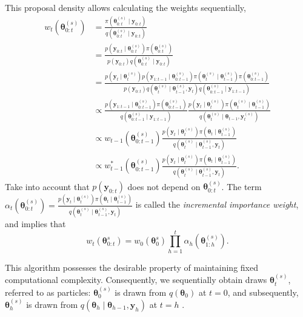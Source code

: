 This proposal density allows calculating the weights sequentially,
\begin{align*}
	w_{t}(\bm{\theta}^{(s)}_{0:t})&=\frac{\pi(\bm{\theta}_{0:t}^{(s)}\mid \bm{y}_{0:t})}{q(\bm{\theta}_{0:t}^{(s)}\mid \bm{y}_{0:t})}\\
	&=\frac{p(\bm{y}_{0:t}\mid \bm{\theta}_{0:t}^{(s)})\pi(\bm{\theta}_{0:t}^{(s)})}{p(\bm{y}_{0:t})q(\bm{\theta}_{0:t}^{(s)}\mid \bm{y}_{0:t})}\\
	&=\frac{p(\bm{y}_{t}\mid \bm{\theta}_{t}^{(s)})p(\bm{y}_{1:t-1}\mid \bm{\theta}_{0:t-1}^{(s)})\pi(\bm{\theta}_{t}^{(s)}\mid \bm{\theta}_{t-1}^{(s)})\pi(\bm{\theta}_{0:t-1}^{(s)})}{p(\bm{y}_{0:t})q(\bm{\theta}_{t}^{(s)}\mid \bm{\theta}_{t-1}^{(s)},\bm{y}_{t})q(\bm{\theta}_{0:t-1}^{(s)}\mid \bm{y}_{1:t-1})}\\
	&\propto\frac{p(\bm{y}_{1:t-1}\mid \bm{\theta}_{0:t-1}^{(s)})\pi(\bm{\theta}_{0:t-1}^{(s)})}{q(\bm{\theta}_{0:t-1}^{(s)}\mid \bm{y}_{1:t-1})}\frac{p(\bm{y}_{t}\mid \bm{\theta}_{t}^{(s)})\pi(\bm{\theta}_{t}^{(s)}\mid \bm{\theta}_{t-1}^{(s)})}{q(\bm{\theta}_{t}^{(s)}\mid \bm{\theta}_{t-1},\bm{y}_{t}^{(s)})}\\
	&\propto w_{t-1}(\bm{\theta}^{(s)}_{0:t-1})\frac{p(\bm{y}_{t}\mid \bm{\theta}_{t}^{(s)})\pi(\bm{\theta}_{t}\mid \bm{\theta}_{t-1}^{(s)})}{q(\bm{\theta}_t^{(s)}\mid \bm{\theta}_{t-1}^{(s)},\bm{y}_{t})}\\
	&\propto w_{t-1}^*(\bm{\theta}^{(s)}_{0:t-1})\frac{p(\bm{y}_{t}\mid \bm{\theta}_{t}^{(s)})\pi(\bm{\theta}_{t}\mid \bm{\theta}_{t-1}^{(s)})}{q(\bm{\theta}_t^{(s)}\mid \bm{\theta}_{t-1}^{(s)},\bm{y}_{t})}.
\end{align*} 
Take into account that $p(\bm{y}_{0:t})$ does not depend on $\bm{\theta}^{(s)}_{0:t}$. The term $\alpha_t(\bm{\theta}_{0:t}^{(s)})=\frac{p(\bm{y}_{t}\mid \bm{\theta}_{t}^{(s)})\pi(\bm{\theta}_{t}\mid \bm{\theta}_{t-1}^{(s)})}{q(\bm{\theta}_t^{(s)}\mid \bm{\theta}_{t-1}^{(s)},\bm{y}_{t})}$ is called the \textit{incremental importance weight}, and implies that
$$w_t(\bm{\theta}^{s}_{0:t})=w_0(\bm{\theta}^{s}_{0})\prod_{h=1}^{t}\alpha_h(\bm{\theta}_{1:h}^{(s)}).$$ 

This algorithm possesses the desirable property of maintaining fixed computational complexity. Consequently, we sequentially obtain draws $\bm{\theta}_t^{(s)}$, referred to as particles: $\bm{\theta}_0^{(s)}$ is drawn from $q(\bm{\theta}_0)$ at $t=0$, and subsequently, $\bm{\theta}_h^{(s)}$ is drawn from $q(\bm{\theta}_h\mid \bm{\theta}_{h-1},\bm{y}_{h})$ at $t=h$ \cite{doucet2001introduction,cappe2007overview}.

